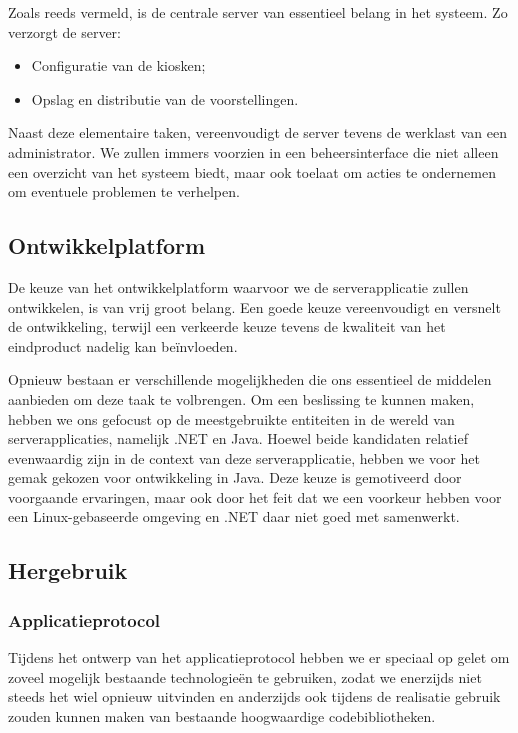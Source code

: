 \documentclass[verslag.tex]{subfiles}
\begin{document}
Zoals reeds vermeld, is de centrale server van essentieel belang in het systeem. Zo verzorgt de server:
\begin{itemize}
\item Configuratie van de kiosken;
\item Opslag en distributie van de voorstellingen.
\end{itemize}

Naast deze elementaire taken, vereenvoudigt de server tevens de werklast van een administrator. We zullen immers voorzien in een beheersinterface die niet alleen een overzicht van het systeem biedt, maar ook toelaat om acties te ondernemen om eventuele problemen te verhelpen.

\subsection{Ontwikkelplatform}

De keuze van het ontwikkelplatform waarvoor we de serverapplicatie zullen ontwikkelen, is van vrij groot belang. Een goede keuze vereenvoudigt en versnelt de ontwikkeling, terwijl een verkeerde keuze tevens de kwaliteit van het eindproduct nadelig kan beïnvloeden.

Opnieuw bestaan er verschillende mogelijkheden die ons essentieel de middelen aanbieden om deze taak te volbrengen. Om een beslissing te kunnen maken, hebben we ons gefocust op de meestgebruikte entiteiten in de wereld van serverapplicaties, namelijk .NET en Java. Hoewel beide kandidaten relatief evenwaardig zijn in de context van deze serverapplicatie, hebben we voor het gemak gekozen voor ontwikkeling in Java. Deze keuze is gemotiveerd door voorgaande ervaringen, maar ook door het feit dat we een voorkeur hebben voor een Linux-gebaseerde omgeving en .NET daar niet goed met samenwerkt.

\subsection{Hergebruik}

\subsubsection{Applicatieprotocol}

Tijdens het ontwerp van het applicatieprotocol hebben we er speciaal op gelet om zoveel mogelijk bestaande technologieën te gebruiken, zodat we enerzijds niet steeds het wiel opnieuw uitvinden en anderzijds ook tijdens de realisatie gebruik zouden kunnen maken van bestaande hoogwaardige codebibliotheken.
\end{document}
